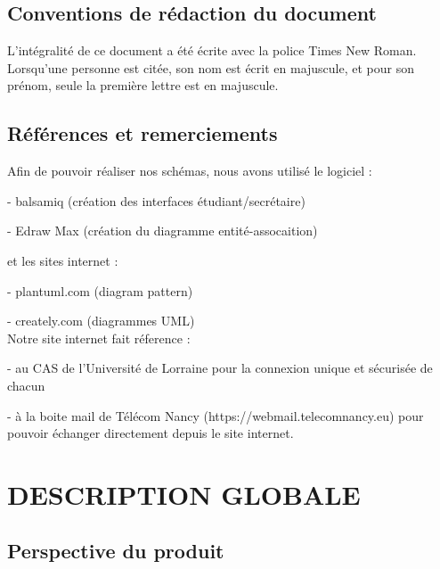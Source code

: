 \documentclass{scrreprt}
\begin{document}
\section{Conventions de rédaction du document}

\hspace{1cm}L'intégralité de ce document a été écrite avec la police Times New Roman.\\

\hspace{0.6cm}Lorsqu'une personne est citée, son nom est écrit en majuscule, et pour son prénom, seule la première lettre est en majuscule.

\section{Références et remerciements}
\hspace{1cm}Afin de pouvoir réaliser nos schémas, nous avons utilisé le logiciel : 

\hspace{1cm}- balsamiq (création des interfaces étudiant/secrétaire)

\hspace{1cm}- Edraw Max (création du diagramme entité-assocaition)

et les sites internet :

\hspace{1cm}- plantuml.com (diagram pattern)

\hspace{1cm}- creately.com (diagrammes UML)\\

\hspace{0.6cm}Notre site internet fait réference :

\hspace{1cm}- au CAS de l'Université de Lorraine pour la connexion unique et sécurisée de chacun

\hspace{1cm}- à la boite mail de Télécom Nancy (https://webmail.telecomnancy.eu) pour pouvoir échanger directement depuis le site internet.\\
	

\chapter{DESCRIPTION GLOBALE }

\section{Perspective du produit}
\end{document}
